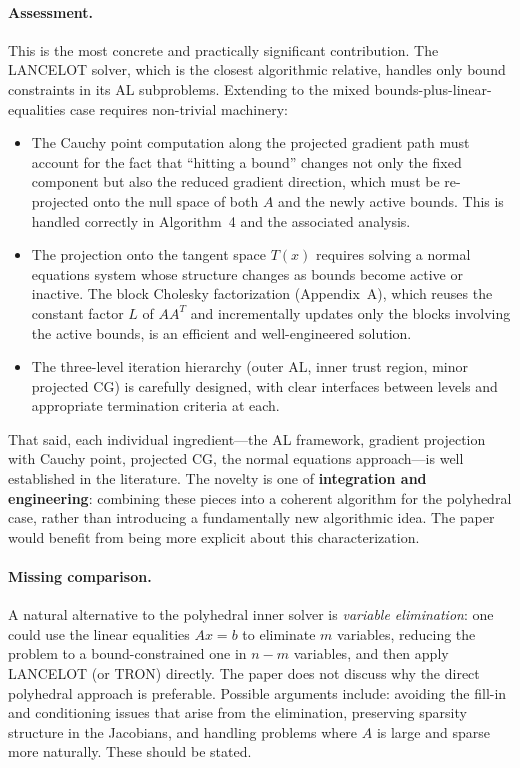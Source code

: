 \documentclass[11pt]{article}
\theoremstyle{plain}
\begin{document}
\paragraph{Assessment.} This is the most concrete and practically significant contribution. The LANCELOT solver, which is the closest algorithmic relative, handles only bound constraints in its AL subproblems. Extending to the mixed bounds-plus-linear-equalities case requires non-trivial machinery:
\begin{itemize}
  \item The Cauchy point computation along the projected gradient path must account for the fact that ``hitting a bound'' changes not only the fixed component but also the reduced gradient direction, which must be re-projected onto the null space of both $A$ and the newly active bounds. This is handled correctly in Algorithm~4 and the associated analysis.
  \item The projection onto the tangent space $T(x)$ requires solving a normal equations system whose structure changes as bounds become active or inactive. The block Cholesky factorization (Appendix~A), which reuses the constant factor $L$ of $AA^T$ and incrementally updates only the blocks involving the active bounds, is an efficient and well-engineered solution.
  \item The three-level iteration hierarchy (outer AL, inner trust region, minor projected CG) is carefully designed, with clear interfaces between levels and appropriate termination criteria at each.
\end{itemize}
That said, each individual ingredient---the AL framework, gradient projection with Cauchy point, projected CG, the normal equations approach---is well established in the literature. The novelty is one of \textbf{integration and engineering}: combining these pieces into a coherent algorithm for the polyhedral case, rather than introducing a fundamentally new algorithmic idea. The paper would benefit from being more explicit about this characterization.

\paragraph{Missing comparison.} A natural alternative to the polyhedral inner solver is \emph{variable elimination}: one could use the linear equalities $Ax = b$ to eliminate $m$ variables, reducing the problem to a bound-constrained one in $n - m$ variables, and then apply LANCELOT (or TRON) directly. The paper does not discuss why the direct polyhedral approach is preferable. Possible arguments include: avoiding the fill-in and conditioning issues that arise from the elimination, preserving sparsity structure in the Jacobians, and handling problems where $A$ is large and sparse more naturally. These should be stated.
\end{document}
